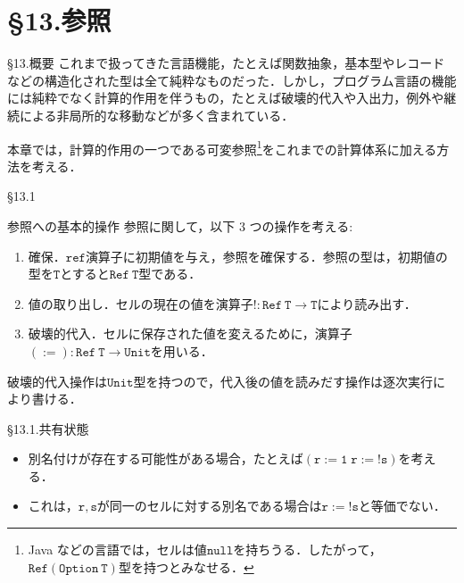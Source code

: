 \documentclass[9pt]{beamer}
\begin{document}
\section{\S13.参照}
\begin{frame}{\S13.概要}
これまで扱ってきた言語機能，たとえば関数抽象，基本型やレコードなどの構造化された型は全て純粋なものだった．しかし，プログラム言語の機能には純粋でなく計算的作用を伴うもの，たとえば破壊的代入や入出力，例外や継続による非局所的な移動などが多く含まれている．

本章では，計算的作用の一つである可変参照\footnote{Java などの言語では，セルは値$\mathtt{null}$を持ちうる．したがって，$\mathtt{Ref(Option\ T)}$型を持つとみなせる．}をこれまでの計算体系に加える方法を考える．
\end{frame}
\begin{frame}{\S13.1}
\begin{alertblock}{参照への基本的操作}
参照に関して，以下 3 つの操作を考える:\begin{enumerate}
\item 確保．$\mathtt{ref}$演算子に初期値を与え，参照を確保する．参照の型は，初期値の型を$\mathtt{T}$とすると$\mathtt{Ref\ T}$型である．
\item 値の取り出し．セルの現在の値を演算子$\mathtt{!:Ref\ T\to T}$により読み出す．
\item 破壊的代入．セルに保存された値を変えるために，演算子$\mathtt{(:=):Ref\ T\to Unit}$を用いる．
\end{enumerate}
破壊的代入操作は$\mathtt{Unit}$型を持つので，代入後の値を読みだす操作は逐次実行により書ける．
\end{alertblock}

\end{frame}
\begin{frame}{\S13.1.共有状態}
\begin{itemize}
\item 別名付けが存在する可能性がある場合，たとえば$\mathtt{(r:=1\; r:=!s)}$を考える．
\item これは，$\mathtt{r,s}$が同一のセルに対する別名である場合は$\mathtt{r:=!s}$と等価でない．
\end{itemize}
\end{frame}
\end{document}
